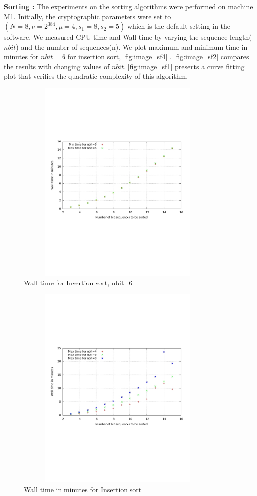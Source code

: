 \documentclass{acm_proc_article-sp}
\begin{document}
 \textbf{Sorting :} 
The experiments on the sorting algorithms were performed on machine M1. 
Initially, the cryptographic parameters were set to $(N = 8, \nu = 2^{384}, \mu = 4, s_1 = 8, s_2 = 5)$ which is the default setting in the software. We measured CPU time and Wall time by varying the sequence length($nbit$) and the number of sequences(n). We plot maximum and minimum time in minutes for $nbit=6$ for insertion sort, \autoref{fig:image_sf4} . \autoref{fig:image_sf2} compares the results with changing values of $nbit$. \autoref{fig:image_sf1} presents a curve fitting plot that verifies the quadratic complexity of this algorithm.

\begin{figure} %
\centering
\includegraphics[width=10cm, height=10cm]{fsort4.pdf} 
\caption{Wall time for Insertion sort, nbit=6} 
\label{fig:image_sf4} %
\end{figure}


\begin{figure} %
\centering
\includegraphics[width=10cm, height=10cm]{fsort2.pdf} 
\caption{Wall time in minutes for Insertion sort} 
\label{fig:image_sf2} %
\end{figure}
\end{document}
